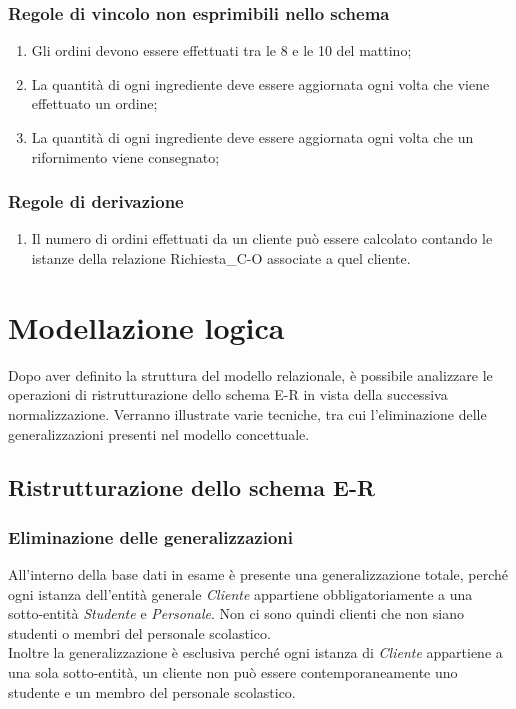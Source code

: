 \documentclass[12pt,a4paper]{article}
\begin{document}
    \subsubsection{Regole di vincolo non esprimibili nello schema}
    \begin{enumerate}[leftmargin=3em,label=\textbf{(RV\arabic*)}]
        \item  Gli ordini devono essere effettuati tra le 8 e le 10 del mattino;
        \item La quantità di ogni ingrediente deve essere aggiornata ogni volta che viene effettuato un ordine;
        \item La quantità di ogni ingrediente deve essere aggiornata ogni volta che un rifornimento viene consegnato;
    \end{enumerate}

    \subsubsection{Regole di derivazione}
    \begin{enumerate}[leftmargin=3em,label=\textbf{(RD\arabic*)}]
        \item  Il numero di ordini effettuati da un cliente può essere calcolato contando le istanze della relazione Richiesta\_C-O associate a quel cliente.
    \end{enumerate}

    \newpage
    \section{Modellazione logica}
    Dopo aver definito la struttura del modello relazionale, è possibile analizzare le operazioni  di ristrutturazione dello schema E-R in vista della successiva normalizzazione. Verranno illustrate varie tecniche, tra cui l'eliminazione delle generalizzazioni presenti nel modello concettuale.

    \subsection{Ristrutturazione dello schema E-R}
    \subsubsection{Eliminazione delle generalizzazioni}
    All'interno della base dati in esame è presente una generalizzazione totale, perché ogni istanza dell'entità generale \textit{Cliente} appartiene obbligatoriamente a una sotto-entità \textit{Studente} e \textit{Personale}. Non ci sono quindi clienti che non siano studenti o membri del personale scolastico.\\
    Inoltre la generalizzazione è esclusiva perché ogni istanza di \textit{Cliente} appartiene a una sola sotto-entità, un cliente non può essere contemporaneamente uno studente e un membro del personale scolastico.
\end{document}
